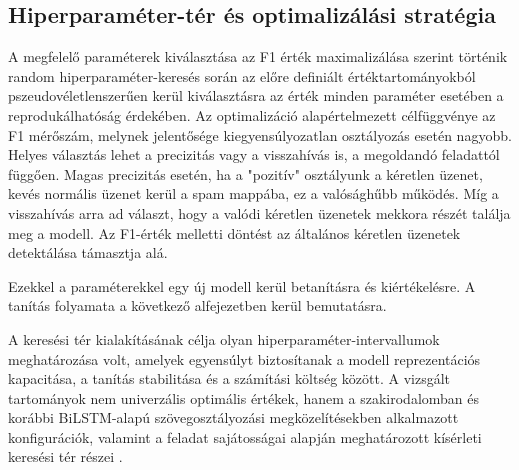 \subsection{Hiperparaméter-tér és optimalizálási stratégia}

A megfelelő paraméterek kiválasztása az F1 érték maximalizálása szerint történik random hiperparaméter-keresés során az előre definiált értéktartományokból \cite{randomsearch}
pszeudovéletlenszerűen kerül kiválasztásra az érték minden paraméter esetében a reprodukálhatóság érdekében. Az optimalizáció alapértelmezett célfüggvénye az F1 mérőszám, melynek jelentősége kiegyensúlyozatlan osztályozás esetén nagyobb. Helyes választás lehet a precizitás vagy a visszahívás is, a megoldandó feladattól függően.
Magas precizitás esetén, ha a "pozitív" osztályunk a kéretlen üzenet, kevés normális üzenet kerül a spam mappába, ez a valósághűbb működés. Míg a visszahívás arra ad választ, hogy a valódi kéretlen üzenetek mekkora részét találja meg a modell. 
Az F1-érték melletti döntést az általános kéretlen üzenetek detektálása támasztja alá. 

Ezekkel a paraméterekkel egy új modell kerül betanításra és kiértékelésre. A tanítás folyamata a következő alfejezetben kerül bemutatásra.

A keresési tér kialakításának célja olyan hiperparaméter-intervallumok meghatározása volt, amelyek egyensúlyt biztosítanak a modell reprezentációs kapacitása, a tanítás stabilitása és a számítási költség között. A vizsgált tartományok nem univerzális optimális értékek, hanem a szakirodalomban és korábbi BiLSTM-alapú szövegosztályozási megközelítésekben alkalmazott konfigurációk, valamint a feladat sajátosságai alapján meghatározott kísérleti keresési tér részei \cite{mlltclassificationbilstm, qin2023bilstm_attention}.  

